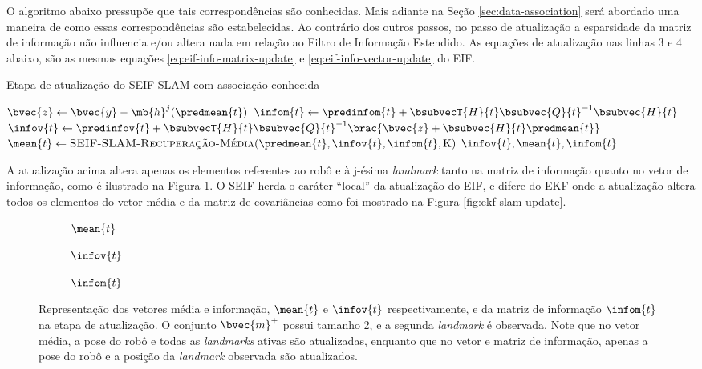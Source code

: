 O algoritmo abaixo pressupõe que tais correspondências são 
conhecidas. Mais adiante na Seção \ref{sec:data-association} será 
abordado uma maneira de como essas correspondências são estabelecidas. 
Ao contrário dos outros passos, no passo de atualização a esparsidade da 
matriz de informação não influencia e/ou altera nada em relação ao 
Filtro de Informação Estendido. As equações de atualização nas linhas 
3 e 4 abaixo, são as mesmas equações \ref{eq:eif-info-matrix-update} e 
\ref{eq:eif-info-vector-update} do EIF.

\begin{algorithm}[h]
  \caption{Etapa de atualização do SEIF-SLAM com associação conhecida}
  \label{alg:seif-slam-update-known-associations}
\begin{algorithmic}[1]
  \State $\bvec{z} \gets \bvec{y} - \mb{h}^j(\predmean{t})$
  \State $\infom{t} \gets \predinfom{t} + \bsubvecT{H}{t} \bsubvec{Q}{t}^{-1} \bsubvec{H}{t}$
  \State $\infov{t} \gets \predinfov{t} + \bsubvecT{H}{t}\bsubvec{Q}{t}^{-1} 
  \brac{\bvec{z} + \bsubvec{H}{t}\predmean{t}}$
  \State $\mean{t} \gets \textproc{SEIF-SLAM-Recuperação-Média}(\predmean{t}, \infov{t}, \infom{t}, \mathrm{K})$
  \State \Return $\infov{t}, \mean{t}, \infom{t}$
  \EndProcedure
\end{algorithmic}
\end{algorithm}

A atualização acima altera apenas os elementos referentes ao robô e à 
j-ésima \textit{landmark} tanto na matriz de informação quanto no vetor 
de informação, como é ilustrado na Figura \ref{fig:seif-slam-update}. O SEIF 
herda o caráter ``local'' da atualização do EIF, e difere do EKF onde a 
atualização altera todos os elementos do vetor média e da matriz de 
covariâncias como foi mostrado na Figura \ref{fig:ekf-slam-update}.
\begin{figure}[h]
  \begin{subfigure}{.30\textwidth}
    
    \caption{$\mean{t}$}
  \end{subfigure}
  \hfill
  \begin{subfigure}{.30\textwidth}
    
    \caption{$\infov{t}$}
  \end{subfigure}
  \hfill
  \begin{subfigure}{.3\textwidth}
    
    \caption{$\infom{t}$}
  \end{subfigure}
  \caption{Representação dos vetores média e informação, $\mean{t}$ e $\infov{t}$ respectivamente, e da matriz de informação $\infom{t}$ na 
  etapa de atualização. O conjunto $\bvec{m}^+$ possui tamanho 2, e a 
  segunda \textit{landmark} é observada. Note que no vetor média, 
  a pose do robô e todas as \textit{landmarks} ativas são atualizadas, 
  enquanto que no vetor e matriz de informação, apenas a pose do robô e 
  a posição da \textit{landmark} observada são atualizados.}
  \label{fig:seif-slam-update}
\end{figure}

